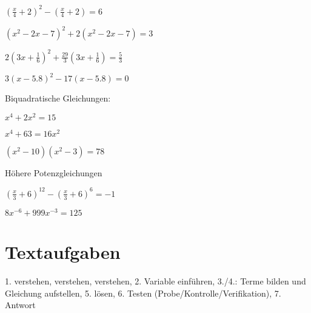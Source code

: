 \begin{bbwAufgabenBlock}
\item $\left( \frac{x}4 + 2  \right)^2 - \left( \frac{x}4 + 2 \right) = 6$

\item $\left( x^2-2x-7 \right)^2 + 2 \left(  x^2-2x-7 \right) = 3$

\item $2 \left( 3x+\frac16 \right)^2 +\frac{29}3 \left(  3x+\frac16 \right) = \frac53$

\item $3(x-5.8)^2 - 17(x-5.8) = 0$

Biquadratische Gleichungen:

\item $x^4 + 2x^2 = 15$

\item $x^4 + 63 = 16x^2$


\item $(x^2-10)(x^2-3) = 78$


Höhere Potenzgleichungen

\item $\left(\frac{x}3 + 6 \right)^{12} - \left(\frac{x}3 + 6  \right)^6 = -1$

\item $8x^{-6} + 999x^{-3} = 125$


\end{bbwAufgabenBlock}
\newpage




\section{Textaufgaben}

1. verstehen, verstehen, verstehen, 2. Variable einführen, 3./4.: Terme bilden und Gleichung aufstellen,
5. lösen, 6. Testen (Probe/Kontrolle/Verifikation), 7. Antwort

